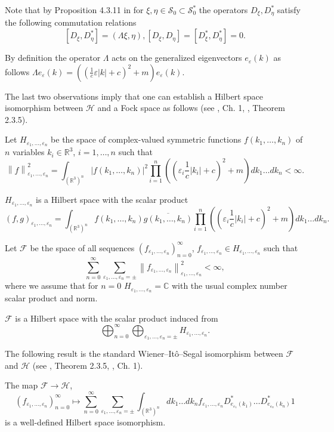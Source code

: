 \documentclass{amsart}
\begin{document}
Note that by Proposition 4.3.11 in \cite{Ob} for $\xi,\eta\in \mathcal{S}_0\subset \mathcal{S}_0^*$ the operators $D_\xi,D_\eta^*$ satisfy the following commutation relations
\begin{equation}\label{commrel}
[D_\xi,D^*_\eta]=(\Lambda\xi,\eta),[D_\xi,D_\eta]=[D_\xi^*,D^*_\eta]=0.	
\end{equation}

By definition the operator $\Lambda$ acts on the generalized eigenvectors $e_{\varepsilon}(k)$ as follows $\Lambda e_{\varepsilon}(k)=((\frac1c\varepsilon|k|+c)^2+m)e_{\varepsilon}(k)$.

The last two observations imply that one can establish a Hilbert space isomorphism between $\mathcal{H}$ and a Fock space as follows (see \cite{Ber}, Ch. 1, \cite{Ob}, Theorem 2.3.5).

Let $H_{\varepsilon_1,\ldots, \varepsilon_n}$ be the space of complex-valued symmetric functions $f(k_1,\ldots, k_n)$ of $n$ variables $k_i\in \mathbb{R}^3$, $i=1,\ldots, n$ such that 
$$
\left\|f\right\|_{\varepsilon_1,\ldots, \varepsilon_n}^2=\int_{(\mathbb{R}^3)^n}|f(k_1,\ldots, k_n)|^2\prod_{i=1}^n((\varepsilon_i\frac1c|k_i|+c)^2+m)dk_1\ldots dk_n<\infty.
$$

$H_{\varepsilon_1,\ldots, \varepsilon_n}$ is a Hilbert space with the scalar product
$$
(f,g)_{\varepsilon_1,\ldots, \varepsilon_n}=\int_{(\mathbb{R}^3)^n}f(k_1,\ldots, k_n)\overline{g(k_1,\ldots, k_n)}\prod_{i=1}^n((\varepsilon_i\frac1c|k_i|+c)^2+m)dk_1\ldots dk_n.
$$

Let $\mathcal{F}$ be the space of all sequences $(f_{\varepsilon_1,\ldots, \varepsilon_n})_{n=0}^\infty$, $f_{\varepsilon_1,\ldots, \varepsilon_n}\in H_{\varepsilon_1,\ldots, \varepsilon_n}$ such that
$$
\sum_{n=0}^\infty\sum_{\varepsilon_1,\ldots,\varepsilon_n=\pm}\left\|f_{\varepsilon_1,\ldots, \varepsilon_n}\right\|_{\varepsilon_1,\ldots, \varepsilon_n}^2<\infty,
$$
where we assume that for $n=0$ $H_{\varepsilon_1,\ldots, \varepsilon_n}=\mathbb{C}$ with the usual complex number scalar product and norm.

$\mathcal{F}$ is a Hilbert space with the scalar product induced from
$$\bigoplus_{n=0}^\infty\bigoplus_{\varepsilon_1,\ldots,\varepsilon_n=\pm} H_{\varepsilon_1,\ldots, \varepsilon_n}.$$ 

The following result is the standard Wiener--It\^{o}--Segal isomorphism between $\mathcal{F}$ and $\mathcal{H}$ (see \cite{Ob}, Theorem 2.3.5, \cite{Ber}, Ch. 1).
\begin{theorem}\label{FTR}
The map
$\mathcal{F}\rightarrow \mathcal{H}$,
$$
(f_{\varepsilon_1,\ldots, \varepsilon_n})_{n=0}^\infty\mapsto\sum_{n=0}^\infty\sum_{\varepsilon_1,\ldots,\varepsilon_n=\pm}\int_{(\mathbb{R}^3)^n}dk_1\ldots dk_nf_{\varepsilon_1,\ldots, \varepsilon_n}D_{e_{\varepsilon_1}(k_1)}^*\ldots D^*_{e_{\varepsilon_n}(k_n)}1
$$
is a well-defined Hilbert space isomorphism.
\end{theorem}
\end{document}
